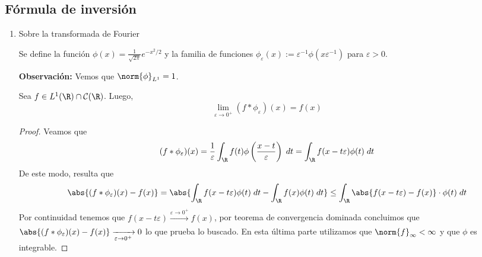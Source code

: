 \documentclass{article}
\begin{document}
\subsection{Fórmula de inversión}
\begin{enumerate}
    \item Sobre la transformada de Fourier
    \begin{dfn}
        Se define la función $\phi(x)=\frac{1}{\sqrt{2\pi}}e^{-x^{2}/2}$ y la familia de funciones
        $\phi_{\varepsilon}(x):=\varepsilon^{-1}\phi(x\varepsilon^{-1})$ para $\varepsilon>0$.
    \end{dfn}
    \vspace{1mm}
    \noindent\textbf{Observación:} Vemos que $\norm{\phi}_{L^{1}}=1$.

    \vspace{2mm}
    \begin{lema}
        Sea $f\in L^{1}(\R)\cap\mathcal{C}(\R)$. Luego,
        \begin{equation*}
            \lim\limits_{\varepsilon\to0^{+}}(f*\phi_{\varepsilon})(x)=f(x)
        \end{equation*}
    \end{lema}
    \begin{proof}
        Veamos que
        \begin{equation*}
            (f*\phi_{\varepsilon})(x)=\frac{1}{\varepsilon}
            \int_{\R}f(t)\phi\left(\frac{x-t}{\varepsilon}\right)\hspace{1mm}dt
            =\int_{\R}f(x-t\varepsilon)\phi(t)\hspace{1mm}dt
        \end{equation*}
        De este modo, resulta que
        \begin{equation*}
            \abs{(f*\phi_{\varepsilon})(x)-f(x)}
            =\abs{\int_{\R}f(x-t\varepsilon)\phi(t)\hspace{1mm}dt
            -\int_{\R}f(x)\phi(t)\hspace{1mm}dt}
            \leq\int_{\R}\abs{f(x-t\varepsilon)-f(x)}\cdot\phi(t)\hspace{1mm}dt
        \end{equation*}
        Por continuidad tenemos que $f(x-t\varepsilon)\xrightarrow[]{\varepsilon\to0^{+}}f(x)$,
        por teorema de convergencia dominada concluimos que $\abs{(f*\phi_{\varepsilon})(x)-f(x)}
        \xrightarrow[\varepsilon\to0^{+}]{}0$ lo que prueba lo buscado. En esta última parte 
        utilizamos que $\norm{f}_{\infty}<\infty$ y que $\phi$ es integrable.
    \end{proof}
    

\end{enumerate}
\end{document}
